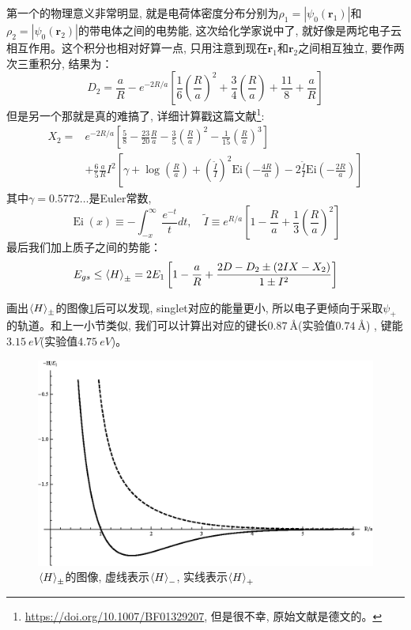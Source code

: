 \documentclass[a4paper,zihao=-4,linespread=1]{ctexrep}
\begin{document}
    第一个的物理意义非常明显, 就是电荷体密度分布分别为$\rho_1=|\psi_0(\mathbf{r}_1)|$和$\rho_2=|\psi_0(\mathbf{r}_2)|$的带电体之间的电势能, 这次给化学家说中了, 
    就好像是两坨电子云相互作用。这个积分也相对好算一点, 只用注意到现在$\mathbf{r}_1$和$\mathbf{r}_2$之间相互独立, 要作两次三重积分, 结果为：
    \begin{equation}
        D_{2}=\frac{a}{R}-e^{-2 R / a}\left[\frac{1}{6}\left(\frac{R}{a}\right)^{2}+\frac{3}{4}\left(\frac{R}{a}\right)+\frac{11}{8}+\frac{a}{R}\right]
    \end{equation}
    但是另一个那就是真的难搞了, 详细计算戳这篇文献\footnote{\url{https://doi.org/10.1007/BF01329207}, 但是很不幸, 原始文献是德文的。}:
    \begin{equation}
        \begin{aligned}
            X_{2}= & e^{-2 R / a}\left[\frac{5}{8}-\frac{23}{20} \frac{R}{a}-\frac{3}{5}\left(\frac{R}{a}\right)^{2}-\frac{1}{15}\left(\frac{R}{a}\right)^{3}\right] \\
            & +\frac{6}{5} \frac{a}{R} I^{2}\left[\gamma+\log \left(\frac{R}{a}\right)+\left(\frac{\tilde{I}}{I}\right)^{2} \mathrm{Ei}\left(-\frac{4 R}{a}\right)-2 \frac{\tilde{I}}{I} \mathrm{Ei}\left(-\frac{2 R}{a}\right)\right]
        \end{aligned}
    \end{equation}
    其中$\gamma=0.5772\ldots$是Euler常数, 
    \[\operatorname{Ei}(x)\equiv -\int_{-x}^{\infty} \frac{e^{-t}}{t} d t,\quad\tilde{I}\equiv e^{R / a}\left[1-\frac{R}{a}+\frac{1}{3}\left(\frac{R}{a}\right)^{2}\right]\]
    最后我们加上质子之间的势能：
    \begin{equation}
        E_{gs}\leq\braket{H}_{\pm}=2 E_{1}\left[1-\frac{a}{R}+\frac{2 D-D_{2} \pm\left(2 I X-X_{2}\right)}{1 \pm I^{2}}\right]
    \end{equation}
    
    画出$\braket{H}_\pm$的图像\ref{fig:8.2}后可以发现, singlet对应的能量更小, 所以电子更倾向于采取$\psi_+$的轨道。和上一小节类似, 我们可以计算出对应的键长$\SI[]{0.87}{\angstrom}$(实验值$\SI[]{0.74}{\angstrom}$)
    , 键能$\SI[]{3.15}{eV}$(实验值$\SI[]{4.75}{eV}$)。
    \begin{figure}[htbp]
        \centering
        \includegraphics[scale=0.8]{fig/8-2.eps}
        \caption{$\braket{H}_\pm$的图像, 虚线表示$\braket{H}_-$, 实线表示$\braket{H}_+$}
        \label{fig:8.2}
    \end{figure}
\end{document}
